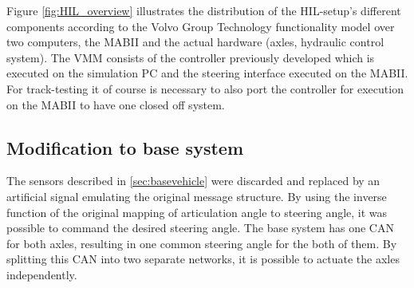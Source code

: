 \documentclass[root.tex]{subfiles}
\begin{document}
 Figure \ref{fig:HIL_overview} illustrates the distribution of the \gls{HIL}-setup's different components according to the Volvo Group Technology functionality model\cite{nilsson2015traffic} over two computers, the \gls{MABII} and the actual hardware (axles, hydraulic control system). The \gls{VMM} consists of the controller previously developed which is executed on the simulation PC and the steering interface executed on the \gls{MABII}. For track-testing it of course is necessary to also port the controller for execution on the \gls{MABII} to have one closed off system. %




\subsection{Modification to base system}
The sensors described in \ref{sec:basevehicle} were discarded and replaced by an artificial signal emulating the original message structure. By using the inverse  function of the original mapping of articulation angle to steering angle, it was possible to command the desired steering angle. The base system has one \gls{CAN} for both axles, resulting in one common steering angle for the both of them. By splitting this \gls{CAN} into two separate networks, it is possible to actuate the axles independently. 
\end{document}
